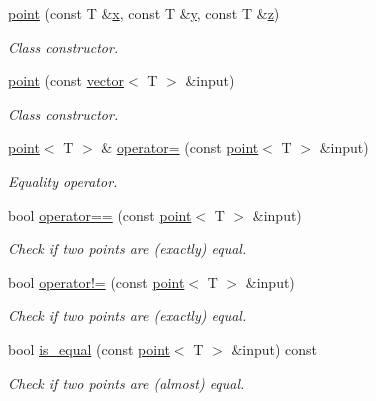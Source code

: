 \begin{DoxyCompactItemize}
\hyperlink{classddd_1_1point_a1f05ca364672341087e1a22b2298d649}{point} (const T \&\hyperlink{classddd_1_1point_af165c07ef348f3d795469b8b0918a3ba}{x}, const T \&\hyperlink{classddd_1_1point_a632f731dfcc4cc1693948d861cb7327d}{y}, const T \&\hyperlink{classddd_1_1point_aeb266a3811a70700ee7d52cacfdc0b9f}{z})
\begin{DoxyCompactList}\small\item\em Class constructor. \end{DoxyCompactList}\item 
\hyperlink{classddd_1_1point_ae0acd00fddc0a7811466874cfcd1f5e4}{point} (const \hyperlink{classddd_1_1vector}{vector}$<$ T $>$ \&input)
\begin{DoxyCompactList}\small\item\em Class constructor. \end{DoxyCompactList}\item 
\hyperlink{classddd_1_1point}{point}$<$ T $>$ \& \hyperlink{classddd_1_1point_ae767e47c1a939d5e6d24b3f810f43170}{operator=} (const \hyperlink{classddd_1_1point}{point}$<$ T $>$ \&input)
\begin{DoxyCompactList}\small\item\em Equality operator. \end{DoxyCompactList}\item 
bool \hyperlink{classddd_1_1point_a98f8e8097257f053b85e1ee32352fda4}{operator==} (const \hyperlink{classddd_1_1point}{point}$<$ T $>$ \&input)
\begin{DoxyCompactList}\small\item\em Check if two points are (exactly) equal. \end{DoxyCompactList}\item 
bool \hyperlink{classddd_1_1point_a2567b8c3cd08d965e70033f3f4a8d3db}{operator!=} (const \hyperlink{classddd_1_1point}{point}$<$ T $>$ \&input)
\begin{DoxyCompactList}\small\item\em Check if two points are (exactly) equal. \end{DoxyCompactList}\item 
bool \hyperlink{classddd_1_1point_aa4cdbbf16736ee09e840e33f77e94b8a}{is\+\_\+equal} (const \hyperlink{classddd_1_1point}{point}$<$ T $>$ \&input) const
\begin{DoxyCompactList}\small\item\em Check if two points are (almost) equal. \end{DoxyCompactList}\item 

\end{DoxyCompactItemize}
